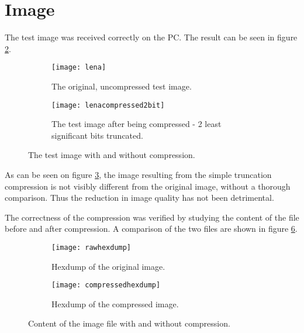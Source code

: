 \section{Image}

The test image was received correctly on the PC. 
The result can be seen in figure \ref{fig:compressedlena}.

\begin{figure}[H]
\centering
\begin{subfigure}{.5\textwidth}
  \centering
  \texttt{[image: lena]}
  \caption{The original, uncompressed test image.}
  \label{fig:lena}
\end{subfigure}%
\begin{subfigure}{.5\textwidth}
  \centering
  \texttt{[image: lenacompressed2bit]}
  \caption{The test image after being  compressed - 2 least significant bits truncated.}
  \label{fig:compressedlena}
\end{subfigure}
\caption{The test image with and without compression.}
\label{fig:lenacomp}
\end{figure}

As can be seen on figure \ref{fig:lenacomp}, the image resulting from the simple truncation compression is not visibly different from the original image, without a thorough comparison. 
Thus the reduction in image quality has not been detrimental.

The correctness of the compression was verified by studying the content of the file before and after compression. 
A comparison of the two files are shown in figure \ref{fig:hexlenacomp}. 

\begin{figure}[H]
\centering
\begin{subfigure}{.5\textwidth}
  \centering
  \texttt{[image: rawhexdump]}
  \caption{Hexdump of the original image.}
  \label{fig:lenahex}
\end{subfigure}%
\begin{subfigure}{.5\textwidth}
  \centering
  \texttt{[image: compressedhexdump]}
  \caption{Hexdump of the compressed image.}
  \label{fig:compressedlenahex}
\end{subfigure}
\caption{Content of the image file with and without compression.}
\label{fig:hexlenacomp}
\end{figure}


